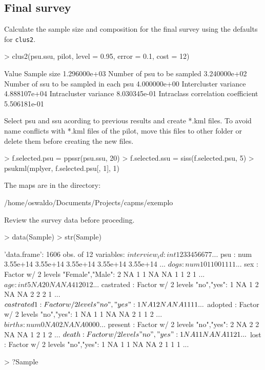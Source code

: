 \documentclass[a4paper]{article}
\begin{document}
\subsection{Final survey}
Calculate the sample size and composition for the final survey using the defaults for \texttt{clus2}.
\begin{Schunk}
\begin{Sinput}
> clus2(psu.ssu, pilot, level = 0.95, error = 0.1, cost = 12)
\end{Sinput}
\begin{Soutput}
                                               Value
Sample size                             1.296000e+03
Number of psu to be sampled             3.240000e+02
Number of ssu to be sampled in each psu 4.000000e+00
Intercluster variance                   4.888107e+04
Intracluster variance                   8.030345e-01
Intraclass correlation coefficient      5.506181e-01
\end{Soutput}
\end{Schunk}

Select psu and ssu acording to previous results and create *.kml files. To avoid name conflicts with *.kml files of the pilot, move this files to other folder or delete them before creating the new files.
\begin{Schunk}
\begin{Sinput}
> f.selected.psu = ppssr(psu.ssu, 20)
> f.selected.ssu = siss(f.selected.psu, 5)
> psukml(mplyer, f.selected.psu[, 1], 1)
\end{Sinput}
\begin{Soutput}
 The maps are in the directory: 

 /home/oswaldo/Documents/Projects/capms/exemplo
\end{Soutput}
\end{Schunk}

Review the survey data before proceding.
\begin{Schunk}
\begin{Sinput}
> data(Sample)
> str(Sample)
\end{Sinput}
\begin{Soutput}
'data.frame':	1606 obs. of  12 variables:
 $ interview_id: int  1 2 3 3 4 5 6 6 7 7 ...
 $ psu         : num  3.55e+14 3.55e+14 3.55e+14 3.55e+14 3.55e+14 ...
 $ dogs        : num  1 0 1 1 0 0 1 1 1 1 ...
 $ sex         : Factor w/ 2 levels "Female","Male": 2 NA 1 1 NA NA 1 1 2 1 ...
 $ age         : int  5 NA 2 0 NA NA 4 12 0 12 ...
 $ castrated   : Factor w/ 2 levels "no","yes": 1 NA 1 2 NA NA 2 2 2 1 ...
 $ castrated1  : Factor w/ 2 levels "no","yes": 1 NA 1 2 NA NA 1 1 1 1 ...
 $ adopted     : Factor w/ 2 levels "no","yes": 1 NA 1 1 NA NA 2 1 1 2 ...
 $ births      : num  0 NA 0 2 NA NA 0 0 0 0 ...
 $ present     : Factor w/ 2 levels "no","yes": 2 NA 2 2 NA NA 1 2 1 2 ...
 $ death       : Factor w/ 2 levels "no","yes": 1 NA 1 1 NA NA 1 1 2 1 ...
 $ lost        : Factor w/ 2 levels "no","yes": 1 NA 1 1 NA NA 2 1 1 1 ...
\end{Soutput}
\begin{Sinput}
> ?Sample
\end{Sinput}
\end{Schunk}
\end{document}
